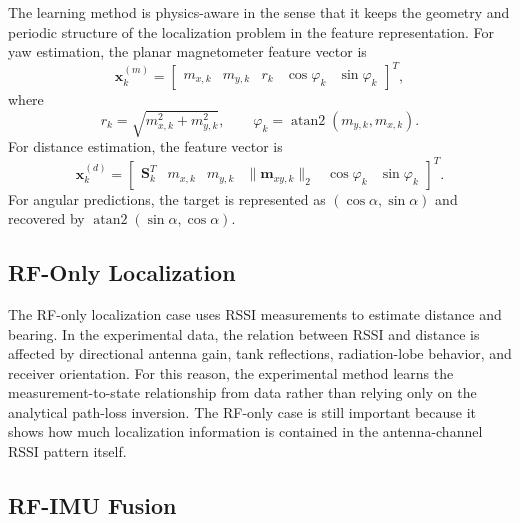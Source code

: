 \documentclass{uhcoethesis}
\begin{document}
The learning method is physics-aware in the sense that it keeps the geometry and periodic structure of the localization problem in the feature representation. For yaw estimation, the planar magnetometer feature vector is
\begin{equation}
    \mathbf{x}^{(m)}_k =
    \begin{bmatrix}
    m_{x,k} & m_{y,k} & r_k & \cos\varphi_k & \sin\varphi_k
    \end{bmatrix}^{T},
    \label{eq:ch5_mag_features}
\end{equation}
where
\begin{equation}
    r_k=\sqrt{m_{x,k}^2+m_{y,k}^2}, \qquad
    \varphi_k=\operatorname{atan2}(m_{y,k},m_{x,k}).
    \label{eq:ch5_mag_radius_heading}
\end{equation}
For distance estimation, the feature vector is
\begin{equation}
    \mathbf{x}^{(d)}_k =
    \begin{bmatrix}
    \mathbf{S}_k^{T} & m_{x,k} & m_{y,k} & \|\mathbf{m}_{xy,k}\|_2 & \cos\varphi_k & \sin\varphi_k
    \end{bmatrix}^{T}.
    \label{eq:ch5_distance_features}
\end{equation}
For angular predictions, the target is represented as $(\cos\alpha,\sin\alpha)$ and recovered by $\operatorname{atan2}(\sin\alpha,\cos\alpha)$.

\subsection{RF-Only Localization}

The RF-only localization case uses RSSI measurements to estimate distance and bearing. In the experimental data, the relation between RSSI and distance is affected by directional antenna gain, tank reflections, radiation-lobe behavior, and receiver orientation. For this reason, the experimental method learns the measurement-to-state relationship from data rather than relying only on the analytical path-loss inversion. The RF-only case is still important because it shows how much localization information is contained in the antenna-channel RSSI pattern itself.

\subsection{RF-IMU Fusion}
\end{document}
